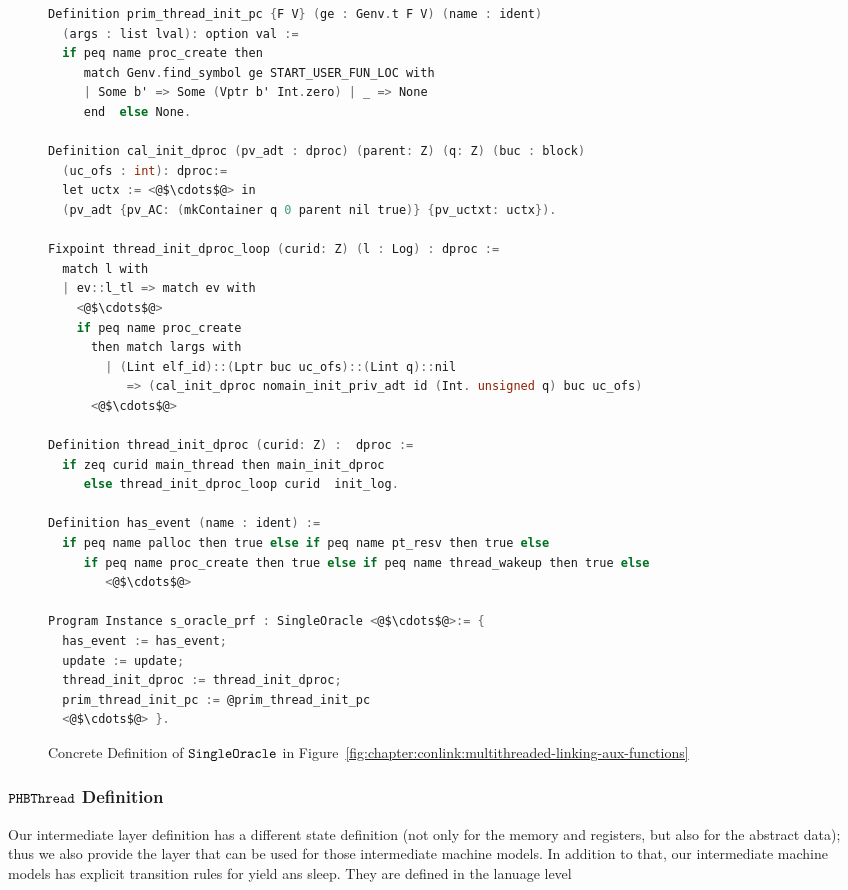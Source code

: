 \begin{figure}
\begin{lstlisting}[language=C, deletekeywords={int}]
Definition prim_thread_init_pc {F V} (ge : Genv.t F V) (name : ident) 
  (args : list lval): option val :=
  if peq name proc_create then 
     match Genv.find_symbol ge START_USER_FUN_LOC with
     | Some b' => Some (Vptr b' Int.zero) | _ => None
     end  else None.

Definition cal_init_dproc (pv_adt : dproc) (parent: Z) (q: Z) (buc : block) 
  (uc_ofs : int): dproc:= 
  let uctx := <@$\cdots$@> in 
  (pv_adt {pv_AC: (mkContainer q 0 parent nil true)} {pv_uctxt: uctx}).

Fixpoint thread_init_dproc_loop (curid: Z) (l : Log) : dproc :=
  match l with 
  | ev::l_tl => match ev with 
    <@$\cdots$@>
    if peq name proc_create
      then match largs with
        | (Lint elf_id)::(Lptr buc uc_ofs)::(Lint q)::nil
           => (cal_init_dproc nomain_init_priv_adt id (Int. unsigned q) buc uc_ofs)
      <@$\cdots$@>

Definition thread_init_dproc (curid: Z) :  dproc :=
  if zeq curid main_thread then main_init_dproc 
     else thread_init_dproc_loop curid  init_log.

Definition has_event (name : ident) :=
  if peq name palloc then true else if peq name pt_resv then true else
     if peq name proc_create then true else if peq name thread_wakeup then true else
        <@$\cdots$@>
 
Program Instance s_oracle_prf : SingleOracle <@$\cdots$@>:= { 
  has_event := has_event;
  update := update;
  thread_init_dproc := thread_init_dproc;
  prim_thread_init_pc := @prim_thread_init_pc
  <@$\cdots$@> }.
\end{lstlisting}
\caption{Concrete Definition of ${\mathrm{\texttt{SingleOracle}}}$ in Figure~\ref{fig:chapter:conlink:multithreaded-linking-aux-functions}}
\label{fig:chapter:certikos:auxfunctions-of-multithreaded-linking-certikos}
\end{figure}

\subsubsection{${\mathrm{\texttt{PHBThread}}}$ Definition}

Our intermediate layer definition has a different state definition (not only for the memory and registers, but also for the abstract data); thus we also provide the 
layer that can be used for those intermediate machine models. 
In addition to that, our intermediate machine models has explicit 
transition rules for yield ans sleep. 
They are defined in the lanuage level 


